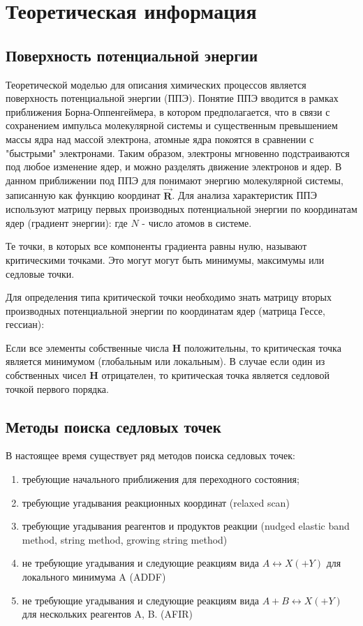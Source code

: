 \section{Теоретическая информация}
\subsection{Поверхность потенциальной энергии}
Теоретической моделью для описания химических процессов является поверхность потенциальной энергии (ППЭ). Понятие ППЭ вводится в рамках приближения Борна-Оппенгеймера, в котором предполагается, что в связи с сохранением импульса молекулярной системы и существенным превышением массы ядра над массой электрона, атомные ядра покоятся в сравнении с "быстрыми" электронами. Таким образом, электроны мгновенно подстраиваются под любое изменение ядер, и можно разделять движение электронов и ядер. В данном приближении под ППЭ для понимают энергию молекулярной системы, записанную как функцию координат $\vec{\textbf{R}}$. Для анализа характеристик ППЭ используют матрицу первых производных потенциальной энергии по координатам ядер (градиент энергии):
где $N$ - число атомов в системе.

Те точки, в которых все компоненты градиента равны нулю, называют критическими точками. Это могут могут быть минимумы, максимумы или седловые точки. 

Для определения типа критической точки необходимо знать матрицу вторых производных потенциальной энергии по координатам ядер (матрица Гессе, гессиан):

Если все элементы собственные числа \textbf{H} положительны, то критическая точка является минимумом (глобальным или локальным). В случае если один из собственных чисел \textbf{H} отрицателен, то критическая точка является седловой точкой первого порядка.

\subsection{Методы поиска седловых точек}
В настоящее время существует ряд методов поиска седловых точек:
\begin{enumerate}
    \item требующие начального приближения для переходного состояния;
    \item требующие угадывания реакционных координат (relaxed scan)
    \item требующие угадывания реагентов и продуктов реакции (nudged elastic band method, string method, growing string method)
    \item не требующие угадывания и следующие реакциям вида $A \leftrightarrow X(+Y)$ для локального минимума A (ADDF)
    \item не требующие угадывания и следующие реакциям вида $A + B \leftrightarrow X(+Y)$ для нескольких реагентов A, B. (AFIR)
\end{enumerate}